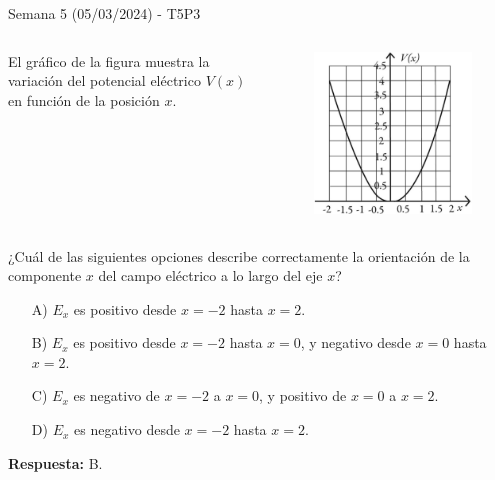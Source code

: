 \begin{frame}{Semana 5 (05/03/2024) - T5P3}
    
    \vspace{-1em}
    
    \begin{columns}
    El gráfico de la figura muestra la variación del potencial eléctrico $V(x)$ en función de la posición $x$.
    \begin{figure}
        \centering
        \includegraphics[scale=0.3]{figures/t5p3.png}
    \end{figure}
    \end{columns}
    
    \vspace{1em}
    
    ¿Cuál de las siguientes opciones describe correctamente la orientación de la componente $x$ del campo eléctrico a lo largo del eje $x$?
    
    \begin{itemize}
        \item[A)] $E_x$ es positivo desde $x = -2$ hasta $x = 2$.

        \item[B)] $E_x$ es positivo desde $x = -2$ hasta $x = 0$, y negativo desde $x = 0$ hasta $x = 2$.
        
        \item[C)] $E_x$ es negativo de $x = -2$ a $x = 0$, y positivo de $x = 0$ a $x = 2$.
        
        \item[D)] $E_x$ es negativo desde $x = -2$ hasta $x = 2$.
    \end{itemize}
    
    \pause \begin{center}
        \textbf{Respuesta:} B.
    \end{center}
    
\end{frame}

